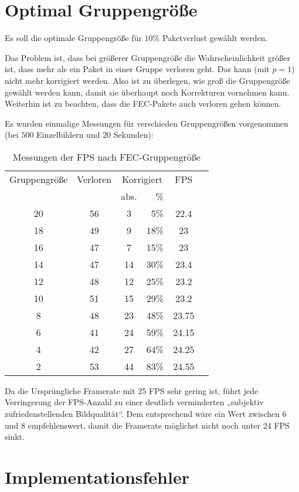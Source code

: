 \documentclass{scrartcl}
\begin{document}
\section{Optimal Gruppengröße}

Es soll die optimale Gruppengröße für $10\%$ Paketverlust gewählt werden.

Das Problem ist, dass bei größerer Gruppengröße die Wahrscheinlichkeit größer ist, dass mehr als ein Paket in einer Gruppe verloren geht. Das kann (mit $p=1$) nicht mehr korrigiert werden. Also ist zu überlegen, wie groß die Gruppengröße gewählt werden kann, damit sie überhaupt noch Korrekturen vornehmen kann. Weiterhin ist zu beachten, dass die FEC-Pakete auch verloren gehen können.

Es wurden einmalige Messungen für verschieden Gruppengrößen vorgenommen (bei $500$ Einzelbildern und $20$ Sekunden):

\begin{table}[!ht]
\centering
\begin{tabular}{c c c r c c }
Gruppengröße & Verloren & \multicolumn{2}{c}{Korrigiert} & FPS\\
& & abs. & \% &\\\hline
20 & 56 & 3  & 5\%  & 22.4 \\
18 & 49 & 9  & 18\% & 23 \\
16 & 47 & 7  & 15\% & 23 \\
14 & 47 & 14 & 30\% & 23.4 \\
12 & 48 & 12 & 25\% & 23.2 \\
10 & 51 & 15 & 29\% & 23.2 \\
8  & 48 & 23 & 48\% & 23.75 \\
6  & 41 & 24 & 59\% & 24.15 \\
4  & 42 & 27 & 64\% & 24.25 \\
2  & 53 & 44 & 83\% & 24.55 \\
\end{tabular}
\caption{Messungen der FPS nach FEC-Gruppengröße}
\end{table}

Da die Ursprüngliche Framerate mit 25 FPS sehr gering ist, führt jede Verringerung der FPS-Anzahl zu einer deutlich verminderten „subjektiv zufriedenstellenden Bildqualität“. Dem entsprechend wäre ein Wert zwischen $6$ und $8$ empfehlenswert, damit die Framerate möglichst nicht noch unter 24 FPS sinkt.

\section{Implementationsfehler}
\end{document}
